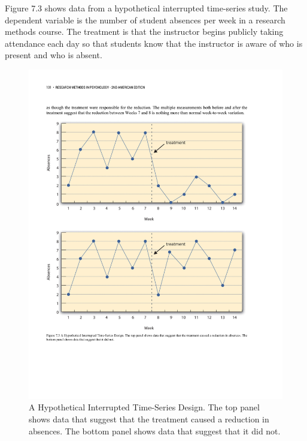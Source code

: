 Figure 7.3 shows data from a hypothetical interrupted time-series study. The dependent variable is the number of student absences per week in a research methods course. The treatment is that the instructor begins publicly taking attendance each day so that students know that the instructor is aware of who is present and who is absent.


\begin{figure}

\includegraphics[width=\linewidth]{figures/C7timeseries.pdf}

\caption{A Hypothetical Interrupted Time-Series Design. The top panel shows data that suggest that the treatment caused a reduction in absences. The bottom panel shows data that suggest that it did not.}

\label{fig:timeseries}

\end{figure}


